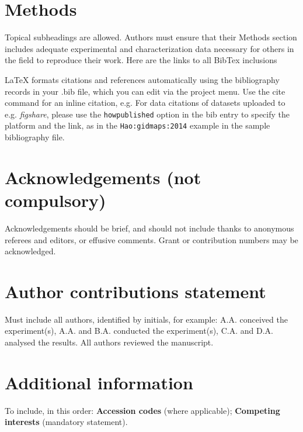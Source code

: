 \documentclass[fleqn,10pt]{wlscirep}
\begin{document}
\section*{Methods}

Topical subheadings are allowed. Authors must ensure that their Methods section includes adequate experimental and characterization data necessary for others in the field to reproduce their work.
Here are the links to all BibTex inclusions \cite{journals/corr/BehdadNZMP16,oai:hal.inria.fr:hal-00762316,journals/neuroimage/KrishnanWMA11,oai:eprints.pascal-network.org:7846,bb86866}







\noindent LaTeX formats citations and references automatically using the bibliography records in your .bib file, which you can edit via the project menu. Use the cite command for an inline citation, e.g.
For data citations of datasets uploaded to e.g. \emph{figshare}, please use the \verb|howpublished| option in the bib entry to specify the platform and the link, as in the \verb|Hao:gidmaps:2014| example in the sample bibliography file.

\section*{Acknowledgements (not compulsory)}

Acknowledgements should be brief, and should not include thanks to anonymous referees and editors, or effusive comments. Grant or contribution numbers may be acknowledged.

\section*{Author contributions statement}

Must include all authors, identified by initials, for example:
A.A. conceived the experiment(s),  A.A. and B.A. conducted the experiment(s), C.A. and D.A. analysed the results.  All authors reviewed the manuscript. 

\section*{Additional information}

To include, in this order: \textbf{Accession codes} (where applicable); \textbf{Competing interests} (mandatory statement). 
\end{document}
